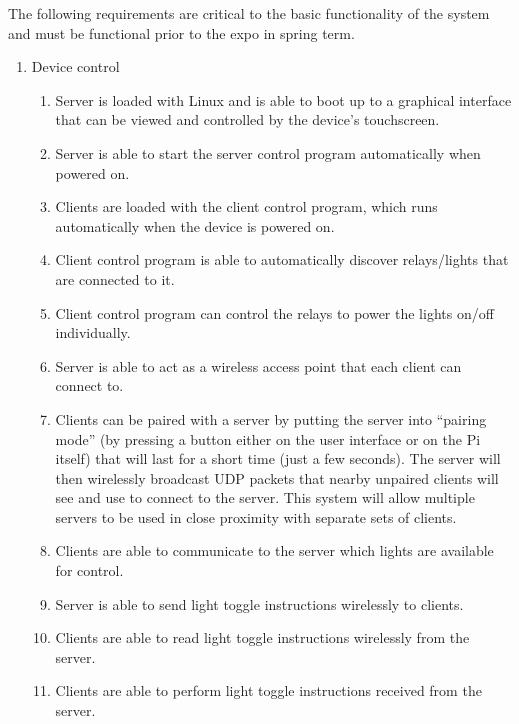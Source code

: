 \documentclass[12pt]{article}
\begin{document}
The following requirements are critical to the basic functionality of the
system and must be functional prior to the expo in spring term.

\begin{enumerate}
    \item Device control
        \begin{enumerate}
            \item Server is loaded with Linux and is able to boot up to a
                graphical interface that can be viewed and controlled by the
                device's touchscreen.
            \item Server is able to start the server control program
                automatically when powered on.
            \item Clients are loaded with the client control program, which
                runs automatically when the device is powered on.
            \item Client control program is able to automatically discover
                relays/lights that are connected to it.
            \item Client control program can control the relays to power the
                lights on/off individually.
            \item Server is able to act as a wireless access point that each
                client can connect to.
            \item Clients can be paired with a server by putting the server
                into ``pairing mode'' (by pressing a button either on the user
                interface or on the Pi itself) that will last for a short time
                (just a few seconds). The server will then wirelessly broadcast
                UDP packets that nearby unpaired clients will see and use to
                connect to the server. This system will allow multiple servers
                to be used in close proximity with separate sets of clients.
            \item Clients are able to communicate to the server which lights
                are available for control.
            \item Server is able to send light toggle instructions wirelessly
                to clients.
            \item Clients are able to read light toggle instructions wirelessly
                from the server.
            \item Clients are able to perform light toggle instructions
                received from the server.
        \end{enumerate}


\end{enumerate}
\end{document}
